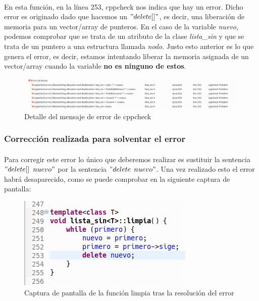 		\paragraph{}En esta función, en la línea 253, cppcheck nos indica que hay un error. Dicho error es originado dado que hacemos un $"delete[]"$, es decir, una liberación de memoria para un vector/array de punteros. En el caso de la variable \textit{nuevo}, podemos comprobar que se trata de un atributo de la clase \textit{lista\_sin} y que se trata de un puntero a una estructura llamada \textit{nodo}. Justo esto anterior es lo que genera el error, es decir, estamos intentando liberar la memoria asignada de un vector/array cuando la variable \textbf{no es ninguno de estos}.
		
		\begin{figure}[H]
			\centering
			\includegraphics[scale=0.38]{img/captura49.png}
			\caption{Detalle del mensaje de error de cppcheck}
			\label{captura49}
		\end{figure}

		\subsubsection{Corrección realizada para solventar el error}
		
		\paragraph{}Para corregir este error lo único que deberemos realizar es sustituir la sentencia $"delete[]$ $nuevo"$ por la sentencia $"delete$ $nuevo"$. Una vez realizado esto el error habrá desaparecido, como se puede comprobar en la siguiente captura de pantalla:
		
		\begin{figure}[H]
			\centering
			\includegraphics[scale=0.7]{img/captura50.png}
			\caption{Captura de pantalla de la función limpia tras la resolución del error}
			\label{captura50}
		\end{figure}


\newpage